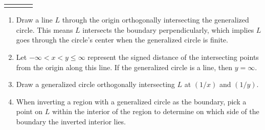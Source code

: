 \documentclass[10pt,mathserif]{beamer}
\begin{document}
\begin{frame}[plain]
\begin{center}
\begin{tabular}{cccc}
{\begin{tikzpicture}[scale=1.0]
\begin{scope}
\clip (0,0) circle ({(1/\r)});
\coordinate (A) at (0.4,0) {};
\coordinate (B) at ({(1/\r)+0.01},0) {};
\coordinate (C) at ({(1/\r)+0.01},1) {};
\tkzMarkRightAngle[size=.1](A,B,C);
\end{scope}
\end{tikzpicture}}
\end{tabular}
\end{center}

\begin{enumerate}
    \item Draw a line $L$ through the origin orthogonally intersecting the generalized circle. This means $L$ intersects the boundary perpendicularly, which implies $L$ goes through the circle's center when the generalized circle is finite.
\item Let $-\infty<x< y\le \infty$ represent the signed distance of the intersecting points from the origin along this line.
If the generalized circle is a line, then $y=\infty$.
\item Draw a generalized circle orthogonally intersecting $L$ at $(1/x)$ and $(1/y)$.
\item When inverting a region with a generalized circle as the boundary, pick a point on $L$ within the interior of the region to determine on which side of the boundary the inverted interior lies.
\end{enumerate}

\end{frame}
\end{document}

